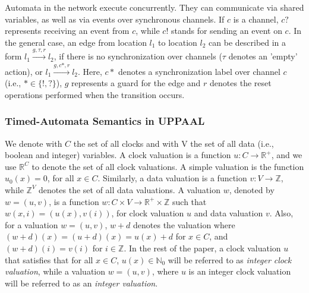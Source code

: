 Automata in the network execute concurrently. They can communicate via shared variables, as well as via events over synchronous channels.  If $c$ is a channel, $c?$ represents receiving an event from $c$, while $c!$ stands for sending an event on $c$. 
In the general case, an edge from location $l_1$ to location $l_2$ can be described in a form 
$
l_1 \xrightarrow{g,\tau,r} l_2
$, 
if there is no synchronization over channels ($\tau$ denotes an 'empty' action), or
$
l_1 \xrightarrow{g,c*,r} l_2
$.
Here, $c*$ denotes a synchronization label over channel $c$ (i.e., $*\in\{!,?\}$), $g$ represents a guard for the edge and $r$ denotes the reset operations performed when the transition occurs. 



\subsubsection{Timed-Automata Semantics in UPPAAL}
We denote with $C$ the set of all clocks and with V the set of all data (i.e., boolean and integer) variables. A clock valuation is a function $u: C\rightarrow \mathbb{R}^+$, and we use $\mathbb{R}^C$ to denote the set of all clock valuations. A simple valuation is the function $u_0(x)=0$, for all $x\in C$. Similarly, a data valuation is a function $v: V\rightarrow \mathbb{Z}$, while $\mathbb{Z}^V$ denotes the set of all data valuations. A valuation $w$, denoted by $w = (u,v)$, is a function $w: C\times V\rightarrow \mathbb{R}^+\times \mathbb{Z}$ such that $w(x,i)=(u(x),v(i))$, for clock valuation $u$ and data valuation $v$. Also, for a valuation $w=(u,v)$, $w+d$ denotes the valuation where $(w+d)(x) = (u+d)(x)=u(x)+d$ for $x\in C$, and $(w+d)(i)=v(i)$ for $i\in\mathbb{Z}$. 
In the rest of the paper, a clock valuation $u$ that satisfies that for all $x\in C$, $u(x)\in\mathbb{N}_0$ will be referred to as \textit{integer clock valuation}, while a valuation $w=(u,v)$, where $u$ is an integer clock valuation will be referred to as an \textit{integer valuation}.

